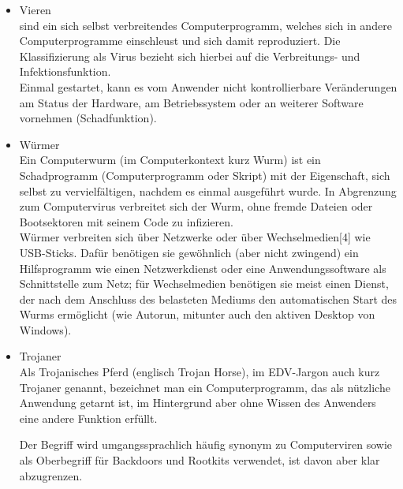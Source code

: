 \begin{itemize}
\item Vieren\\
sind ein sich selbst verbreitendes Computerprogramm, welches sich in andere Computerprogramme einschleust und sich damit reproduziert. Die Klassifizierung als Virus bezieht sich hierbei auf die Verbreitungs- und Infektionsfunktion.\\

Einmal gestartet, kann es vom Anwender nicht kontrollierbare Veränderungen am Status der Hardware, am Betriebssystem oder an weiterer Software vornehmen (Schadfunktion). 
\item Würmer\\
Ein Computerwurm (im Computerkontext kurz Wurm) ist ein Schadprogramm (Computerprogramm oder Skript) mit der Eigenschaft, sich selbst zu vervielfältigen, nachdem es einmal ausgeführt wurde. In Abgrenzung zum Computervirus verbreitet sich der Wurm, ohne fremde Dateien oder Bootsektoren mit seinem Code zu infizieren.\\

Würmer verbreiten sich über Netzwerke oder über Wechselmedien[4] wie USB-Sticks. Dafür benötigen sie gewöhnlich (aber nicht zwingend) ein Hilfsprogramm wie einen Netzwerkdienst oder eine Anwendungssoftware als Schnittstelle zum Netz; für Wechselmedien benötigen sie meist einen Dienst, der nach dem Anschluss des belasteten Mediums den automatischen Start des Wurms ermöglicht (wie Autorun, mitunter auch den aktiven Desktop von Windows).

\item Trojaner\\
Als Trojanisches Pferd (englisch Trojan Horse), im EDV-Jargon auch kurz Trojaner genannt, bezeichnet man ein Computerprogramm, das als nützliche Anwendung getarnt ist, im Hintergrund aber ohne Wissen des Anwenders eine andere Funktion erfüllt.

Der Begriff wird umgangssprachlich häufig synonym zu Computerviren sowie als Oberbegriff für Backdoors und Rootkits verwendet, ist davon aber klar abzugrenzen.
\end{itemize}